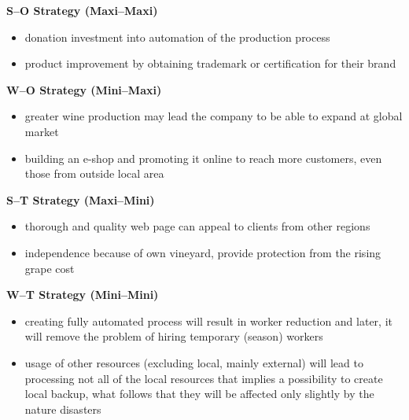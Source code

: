 \documentclass[11pt,a4paper]{article}
\begin{document}
\begin{center}
    \begin{minipage}{0.95\textwidth}

        \textbf{S--O Strategy (Maxi--Maxi)}
        \begin{itemize}
            \item donation investment into automation of the production process
            \item product improvement by obtaining trademark or certification for their brand
        \end{itemize}

        \textbf{W--O Strategy (Mini--Maxi)}
        \begin{itemize}
            \item greater wine production may lead the company to be able to expand at global market
            \item building an e-shop and promoting it online to reach more customers, even those from outside local area
        \end{itemize}

        \textbf{S--T Strategy (Maxi--Mini)}
        \begin{itemize}
            \item thorough and quality web page can appeal to clients from other regions
            \item independence because of own vineyard, provide protection from the rising grape cost
        \end{itemize}

        \textbf{W--T Strategy (Mini--Mini)}
        \begin{itemize}
            \item creating fully automated process will result in worker reduction and later, it will remove the problem of hiring temporary (season) workers
            \item usage of other resources (excluding local, mainly external) will lead to processing not all of the local resources that implies a possibility to create local backup, what follows that they will be affected only slightly by the nature disasters
        \end{itemize}

    \end{minipage}
\end{center}
\end{document}
